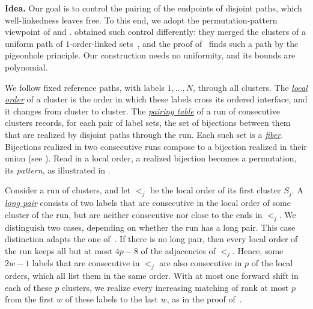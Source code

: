 \documentclass[fontsize=12pt,leading=14pt]{fullpaper}
\newcommand{\idea}[1]{\noindent\textbf{Idea.} #1\par}
\begin{document}
\idea{Our goal is to control the pairing of the endpoints of disjoint paths, which well-linkedness leaves free.
  To this end, we adopt the permutation-pattern viewpoint of \textcite{AtkinsonBeals01} and \textcite{Lehtonen20}.
  \textcite{HKMM26a} obtained such control differently: they merged the clusters of a uniform path of $1$-order-linked sets~\cite[Lemma~7.7 and Theorem~7.8]{HKMM26a}, and the proof of~\cite[Lemma~9.2]{HKMM26a} finds such a path by the pigeonhole principle.
  Our construction needs no uniformity, and its bounds are polynomial.

  We follow fixed reference paths, with labels $1,\dots,N$, through all clusters.
  The \hyperref[def:s3-oneshift-refs]{\emph{local order}} of a cluster is the order in which these labels cross its ordered interface, and it changes from cluster to cluster.
  The \hyperref[def:s3-pairing-table]{\emph{pairing table}} of a run of consecutive clusters records, for each pair of label sets, the set of bijections between them that are realized by disjoint paths through the run.
  Each such set is a \hyperref[def:s3-pairing-table]{\emph{fiber}}.
  Bijections realized in two consecutive runs compose to a bijection realized in their union (see \zcref{lem:s3-join-pairings}).
  Read in a local order, a realized bijection becomes a permutation, its \emph{pattern}, as illustrated in \zcref{fig:ov-s3-routing}.

  Consider a run of clusters, and let $<_j$ be the local order of its first cluster $S_j$.
  A \hyperref[def:s3-long-pair]{\emph{long pair}} consists of two labels that are consecutive in the local order of some cluster of the run, but are neither consecutive nor close to the ends in $<_j$.
  We distinguish two cases, depending on whether the run has a long pair.
  This case distinction adapts the one of~\cite[Fact~4.1 and Lemma~4.2]{Lehtonen20}.
  If there is no long pair, then every local order of the run keeps all but at most $4p-8$ of the adjacencies of $<_j$.
  Hence, some $2w-1$ labels that are consecutive in $<_j$ are also consecutive in $p$ of the local orders, which all list them in the same order.
  With at most one forward shift in each of these $p$ clusters, we realize every increasing matching of rank at most $p$ from the first $w$ of these labels to the last $w$, as in the proof of~\cite[Lemma~7.7]{HKMM26a}.

}
\end{document}
